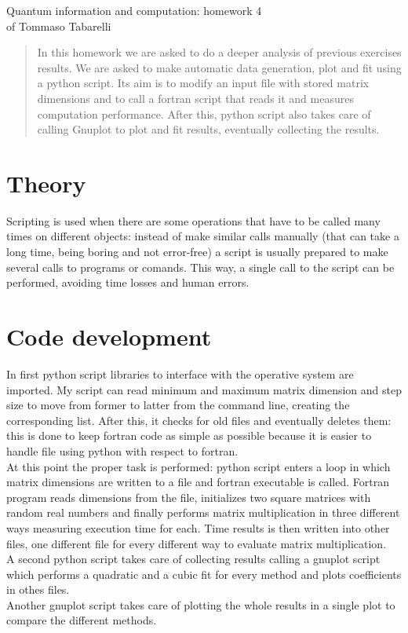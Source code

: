 \documentclass[12pt, a4paper, notitlepage]{report}
\begin{document}
\begin{center}
	\LARGE{Quantum information and computation: homework 4}\\
	\Large{of Tommaso Tabarelli}
\end{center}


\begin{abstract}
	In this homework we are asked to do a deeper analysis of previous exercises results. We are asked to make automatic data generation, plot and fit using a python script. Its aim is to modify an input file with stored matrix dimensions and to call a fortran script that reads it and measures computation performance. After this, python script also takes care of calling Gnuplot to plot and fit results, eventually collecting the results.
\end{abstract}

\section*{Theory}
Scripting is used when there are some operations that have to be called many times on different objects: instead of make similar calls manually (that can take a long time, being boring and not error-free) a script is usually prepared to make several calls to programs or comands. This way, a single call to the script can be performed, avoiding time losses and human errors.

\section*{Code development}
In first python script libraries to interface with the operative system are imported. My script can read minimum and maximum matrix dimension and step size to move from former to latter from the command line, creating the corresponding list. After this, it checks for old files and eventually deletes them: this is done to keep fortran code as simple as possible because it is easier to handle file using python with respect to fortran.\\
At this point the proper task is performed: python script enters a loop in which matrix dimensions are written to a file and fortran executable is called. Fortran program reads dimensions from the file, initializes two square matrices with random real numbers and finally performs matrix multiplication in three different ways measuring execution time for each. Time results is then written into other files, one different file for every different way to evaluate matrix multiplication.\\
A second python script takes care of collecting results calling a gnuplot script which performs a quadratic and a cubic fit for every method and plots coefficients in othes files.\\
Another gnuplot script takes care of plotting the whole results in a single plot to compare the different methods.\\
\end{document}

